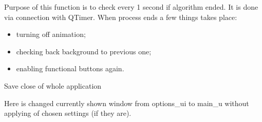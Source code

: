 \documentclass[letterpaper,10pt,english]{sphinxmanual}
\begin{document}
\begin{fulllineitems}
\begin{fulllineitems}
\end{fulllineitems}


\begin{fulllineitems}
\label{\detokenize{main:main.MainWindow.check_script_status}}
\pysigstartsignatures
{}
\pysigstopsignatures
\sphinxAtStartPar
Purpose of this function is to check every 1 second if algorithm ended. It is done via connection with QTimer.
When process ends a few things takes place:
\begin{itemize}
\item {} 
\sphinxAtStartPar
turning off animation;

\item {} 
\sphinxAtStartPar
checking back background to previous one;

\item {} 
\sphinxAtStartPar
enabling functional buttons again.

\end{itemize}

\end{fulllineitems}


\begin{fulllineitems}
\label{\detokenize{main:main.MainWindow.close_app}}
\pysigstartsignatures
{}
\pysigstopsignatures
\sphinxAtStartPar
Save close of whole application

\end{fulllineitems}


\begin{fulllineitems}
\label{\detokenize{main:main.MainWindow.close_options_window}}
\pysigstartsignatures
{}
\pysigstopsignatures
\sphinxAtStartPar
Here is changed currently shown window from options\_ui to main\_u without applying of chosen settings (if they
are).

\end{fulllineitems}


\end{fulllineitems}
\end{document}
